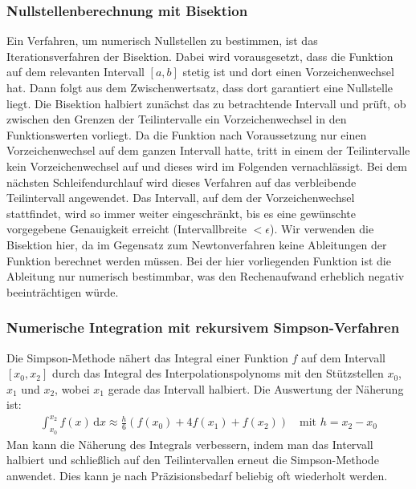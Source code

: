 \documentclass[10pt,a4paper]{article}
\begin{document}
\subsubsection{Nullstellenberechnung mit Bisektion}

Ein Verfahren, um numerisch Nullstellen zu bestimmen, ist das Iterationsverfahren der Bisektion. Dabei wird vorausgesetzt, dass die Funktion auf dem relevanten Intervall $[a,b]$ stetig ist und dort einen Vorzeichenwechsel hat. Dann folgt aus dem Zwischenwertsatz, dass dort garantiert eine Nullstelle liegt. Die Bisektion halbiert zunächst das zu betrachtende Intervall und prüft, ob zwischen den Grenzen der Teilintervalle ein Vorzeichenwechsel in den Funktionswerten vorliegt. Da die Funktion nach Voraussetzung nur einen Vorzeichenwechsel auf dem ganzen Intervall hatte, tritt in einem der Teilintervalle kein Vorzeichenwechsel auf und dieses wird im Folgenden vernachlässigt. Bei dem nächsten Schleifendurchlauf wird dieses Verfahren auf das verbleibende Teilintervall angewendet. Das Intervall, auf dem der Vorzeichenwechsel stattfindet, wird so immer weiter eingeschränkt, bis es eine gewünschte vorgegebene Genauigkeit erreicht (Intervallbreite $<\epsilon$). 
Wir verwenden die Bisektion hier, da im Gegensatz zum Newtonverfahren keine Ableitungen der Funktion  berechnet werden müssen. Bei der hier vorliegenden Funktion ist die Ableitung nur numerisch bestimmbar, was den Rechenaufwand erheblich negativ beeinträchtigen würde.

\subsubsection{Numerische Integration mit rekursivem Simpson-Verfahren}
\label{sssec:integration}

Die Simpson-Methode nähert das Integral einer Funktion $f$ auf dem Intervall $[x_0,x_2]$ durch das Integral des Interpolationspolynoms mit den Stützstellen $x_0$, $x_1$ und $x_2$, wobei $x_1$ gerade das Intervall halbiert. Die Auswertung der Näherung ist:
\begin{align}
  \int_{x_0}^{x_2} f(x) \, \mathrm{d}x \approx \frac{h}{6} \left( f(x_0) + 4 f(x_1) + f(x_2) \right) \quad \text{mit } h = x_2 - x_0
\end{align}
Man kann die Näherung des Integrals verbessern, indem man das Intervall halbiert und schließlich auf den Teilintervallen erneut die Simpson-Methode anwendet. Dies kann je nach Präzisionsbedarf beliebig oft wiederholt werden.
\end{document}
